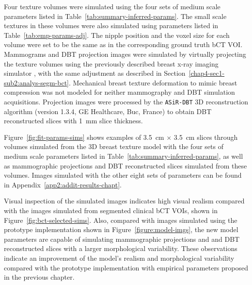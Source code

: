 \documentclass[journal]{IEEEtran}
\begin{document}
Four texture volumes were simulated using the four sets of medium
scale parameters listed in
Table~\ref{tab:summary-inferred-params}. The small scale textures in
these volumes were also simulated using parameters listed in
Table~\ref{tab:emp-params-adj}. The nipple position and the voxel size
for each volume were set to be the same as in the corresponding ground
truth bCT VOI. Mammograms and DBT projection images were simulated by
virtually projecting the texture volumes using the previously
described breast x-ray imaging simulator \cite{milioni2014low}, with
the same adjustment as described in
Section~\ref{chap4-sec1-sub2:analys-segm-bct}. Mechanical breast
texture deformation to mimic breast compression was not modeled for
neither mammography and DBT simulation acquisitions. Projection images
were processed by the \texttt{ASiR-DBT} 3D reconstruction algorithm
(version 1.3.4, GE Healthcare, Buc, France) to obtain DBT
reconstructed slices with \SI{1}{\mm} slice thickness.

Figure~\ref{fig:fit-params-sims} shows examples of \SI{3.5}{\cm}
$\times$ \SI{3.5}{\cm} slices through volumes simulated from the 3D
breast texture model with the four sets of medium scale parameters
listed in Table~\ref{tab:summary-inferred-params}, as well as
mammographic projections and DBT reconstructed slices simulated from
these volumes. Images simulated with the other eight sets of
parameters can be found in Appendix~\ref{app2:addit-results-chapt}.

Visual inspection of the simulated images indicates high visual
realism compared with the images simulated from segmented clinical bCT
VOIs, shown in Figure~\ref{fig:bct-selected-sims}. Also, compared with
images simulated using the prototype implementation shown in
Figure~\ref{figure:model-imgs}, the new model parameters are capable
of simulating mammographic projections and and DBT reconstructed
slices with a larger morphological variability. These observations
indicate an improvement of the model's realism and morphological
variability compared with the prototype implementation with empirical
parameters proposed in the previous chapter.
\end{document}
